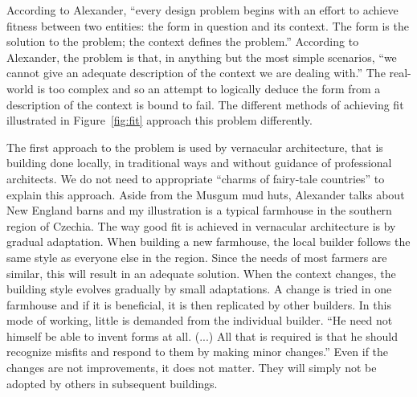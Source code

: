 According to Alexander, ``every design problem begins with an effort to achieve fitness
between two entities: the form in question and its context. The form is the solution to
the problem; the context defines the problem.'' According to Alexander,
the problem is that, in anything but the most simple scenarios, ``we cannot give an adequate
description of the context we are dealing with.'' The real-world is too
complex and so an attempt to logically deduce the form from a description of the context is bound
to fail. The different methods of achieving fit illustrated in Figure~\ref{fig:fit}
approach this problem differently.

The first approach to the problem is used by vernacular architecture, that is building done
locally, in traditional ways and without guidance of professional architects. We do not need
to appropriate ``charms of fairy-tale countries'' to explain this approach. Aside from
the Musgum mud huts, Alexander talks about New England barns and my illustration is a typical
farmhouse in the southern region of Czechia. The way good fit is achieved in vernacular
architecture is by gradual adaptation. When building a new farmhouse, the local builder follows
the same style as everyone else in the region. Since the needs of most farmers are similar,
this will result in an adequate solution. When the context changes, the building style evolves
gradually by small adaptations. A change is tried in one farmhouse and if it is beneficial, it is
then replicated by other builders. In this mode of working, little is demanded from the individual
builder. ``He need not himself be able to invent forms at all. (...) All that is required is that
he should recognize misfits and respond to them by making minor changes.''
Even if the changes are not improvements, it does not matter. They will simply not be adopted
by others in subsequent buildings.

